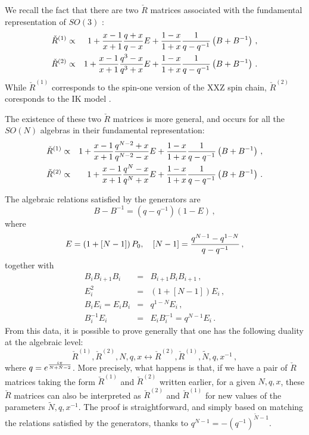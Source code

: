 \documentclass[11pt]{article}
\begin{document}
We recall the fact that there are two $\check{R}$ matrices associated with the fundamental representation of $SO(3)$ \cite{GM2}:
%
\begin{eqnarray}
\check{R}^{(1)} &\propto& 1+{x-1\over x+1}{q+x\over q-x}E+{1-x\over 1+x}{1\over q-q^{-1}}\left(B+B^{-1}\right) \,, \\
\check{R}^{(2)} &\propto &1+{x-1\over x+1}{q^{3}-x\over q^{3}+x}E+{1-x\over 1+x}{1\over q-q^{-1}}\left(B+B^{-1}\right) \,.
\end{eqnarray}
%
While $\check{R}^{(1)}$ corresponds to the spin-one version of the XXZ spin chain, $\check{R}^{(2)}$ coresponds to the IK model \cite{IzergKorep}. 

The existence of these two $\check{R}$ matrices is more general, and occurs for all the $SO(N)$ algebras in their  fundamental representation:
%
\begin{eqnarray}
\check{R}^{(1)}&\propto& 1+{x-1\over x+1}{q^{N-2}+x\over q^{N-2}-x}E+{1-x\over 1+x}{1\over q-q^{-1}}\left(B+B^{-1}\right) \,, \\
\check{R}^{(2)}&\propto &1+{x-1\over x+1}{q^{N}-x\over q^{N}+x}E+{1-x\over 1+x}{1\over q-q^{-1}}\left(B+B^{-1}\right) \,.
\end{eqnarray}
%

The algebraic relations satisfied by the generators  are
%
\begin{equation}
B-B^{-1}=(q-q^{-1})(1-E) \,,
\end{equation}
%
where 
%
\begin{equation}
E=\left(1+[N-1]\right)P_0,~~~[N-1]={q^{N-1}-q^{1-N}\over q-q^{-1}} \,,
\end{equation}
%
together with
%
\begin{eqnarray}
B_iB_{i+1}B_i&=&B_{i+1}B_iB_{i+1} \,, \nonumber\\
E_i^2&=&\left(1+[N-1]\right)E_i \,, \nonumber\\
B_iE_i=E_iB_i&=&q^{1-N}E_i \,, \nonumber\\
B_i^{-1}E_i&=&E_iB_i^{-1}=q^{N-1}E_i \,.
\end{eqnarray}
%
From this data, it is possible to prove generally that one has the following duality at the algebraic level:
%
\begin{equation}
 \check{R}^{(1)}, \check{R}^{(2)}, N, q, x \leftrightarrow
 \check{R}^{(2)}, \check{R}^{(1)}, \tilde{N}, q, x^{-1} \,,
\end{equation}
%
where  $q=e^{i\pi\over N+\tilde{N}-2}$. More precisely, what happens is that, if we have a  pair of $\check{R}$ matrices taking the form $\check{R}^{(1)}$ and $\check{R}^{(2)}$ written earlier, for a given $N,q,x$, these $\check{R}$ matrices can also be interpreted as $\check{R}^{(2)}$ and $\check{R}^{(1)}$ for new values of the parameters $\tilde{N}, q, x^{-1}$. 
The proof is straightforward, and simply based on  matching the relations satisfied by the generators, thanks to  $q^{N-1}=-\left(q^{-1}\right)^{\tilde{N}-1}$. 
\end{document}

